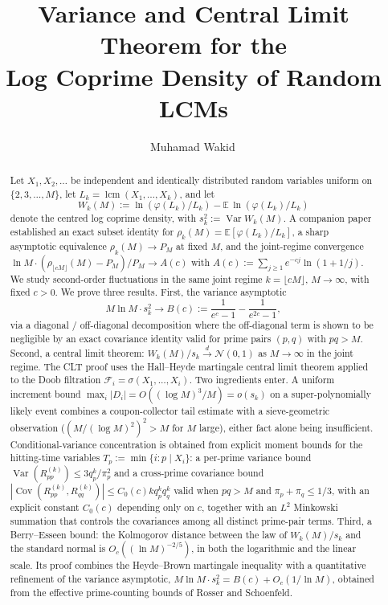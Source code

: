 \documentclass[11pt]{article}
\title{Variance and Central Limit Theorem for the\\[2pt]
Log Coprime Density of Random LCMs}
\author{Muhamad Wakid\,\orcidlink{0009-0008-6274-778X}}
\date{}
\theoremstyle{remark}
\newcommand{\lcm}{\operatorname{lcm}}
\newcommand{\EE}{\mathbb{E}}
\newcommand{\NN}{\mathcal{N}}
\newcommand{\F}{\mathcal{F}}
\DeclareMathOperator{\Var}{Var}
\DeclareMathOperator{\Cov}{Cov}
\begin{document}
\maketitle
\thispagestyle{plain}

\begin{abstract}
Let $X_1, X_2, \ldots$ be independent and identically distributed random variables uniform on $\{2, 3, \ldots, M\}$, let $L_k = \lcm(X_1, \ldots, X_k)$, and let
\[
W_k(M) := \ln(\varphi(L_k)/L_k) - \EE\,\ln(\varphi(L_k)/L_k)
\]
denote the centred log coprime density, with $s_k^2 := \Var W_k(M)$. A companion paper~\cite{wakid1} established an exact subset identity for $\rho_k(M) = \EE[\varphi(L_k)/L_k]$, a sharp asymptotic equivalence $\rho_k(M) \to P_M$ at fixed $M$, and the joint-regime convergence $\ln M \cdot (\rho_{\lfloor cM \rfloor}(M) - P_M)/P_M \to A(c)$ with $A(c) := \sum_{j \geq 1} e^{-cj}\ln(1 + 1/j)$. We study second-order fluctuations in the same joint regime $k = \lfloor cM \rfloor$, $M \to \infty$, with fixed $c > 0$. We prove three results. First, the variance asymptotic
\[
M \ln M \cdot s_k^2 \longrightarrow B(c) := \frac{1}{e^c - 1} - \frac{1}{e^{2c} - 1},
\]
via a diagonal / off-diagonal decomposition where the off-diagonal term is shown to be negligible by an exact covariance identity valid for prime pairs $(p, q)$ with $pq > M$. Second, a central limit theorem: $W_k(M)/s_k \xrightarrow{d} \NN(0, 1)$ as $M \to \infty$ in the joint regime. The CLT proof uses the Hall--Heyde martingale central limit theorem applied to the Doob filtration $\F_i = \sigma(X_1, \ldots, X_i)$. Two ingredients enter. A uniform increment bound $\max_i |D_i| = O((\log M)^3/M) = o(s_k)$ on a super-polynomially likely event combines a coupon-collector tail estimate with a sieve-geometric observation ($(M/(\log M)^2)^2 > M$ for $M$ large), either fact alone being insufficient. Conditional-variance concentration is obtained from explicit moment bounds for the hitting-time variables $T_p := \min\{i : p \mid X_i\}$: a per-prime variance bound $\Var(R_{pp}^{(k)}) \leq 3 q_p^k/\pi_p^2$ and a cross-prime covariance bound $|\Cov(R_{pp}^{(k)}, R_{qq}^{(k)})| \leq C_0(c) k q_p^k q_q^k$ valid when $pq > M$ and $\pi_p + \pi_q \leq 1/3$, with an explicit constant $C_0(c)$ depending only on $c$, together with an $L^2$ Minkowski summation that controls the covariances among all distinct prime-pair terms. Third, a Berry--Esseen bound: the Kolmogorov distance between the law of $W_k(M)/s_k$ and the standard normal is $O_c((\ln M)^{-2/5})$, in both the logarithmic and the linear scale. Its proof combines the Heyde--Brown martingale inequality with a quantitative refinement of the variance asymptotic, $M \ln M \cdot s_k^2 = B(c) + O_c(1/\ln M)$, obtained from the effective prime-counting bounds of Rosser and Schoenfeld.
\end{abstract}
\end{document}
